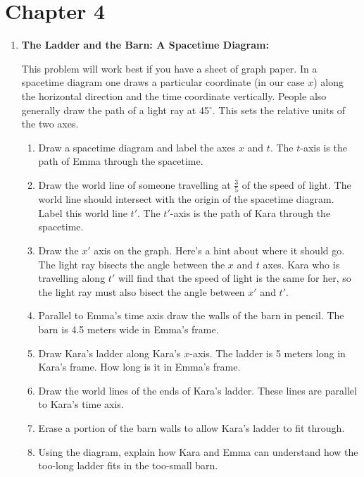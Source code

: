 \documentclass[pdftex,10pt]{article}
\begin{document}
\fi
\section{Chapter 4}
\begin{enumerate}
\item{\bf The Ladder and the Barn: A Spacetime Diagram:}

This problem will work best if you have a sheet of graph paper.
In a spacetime diagram one draws a particular coordinate (in our case
$x$)  along the horizontal direction and the time coordinate
vertically.  People also generally draw the path of a light ray at
45$^\circ$.  This sets the relative units of the two axes.
\begin{enumerate}
\item Draw a spacetime diagram and label the axes $x$ and
  $t$.  The $t$-axis is the path of Emma through the spacetime.

\item Draw the world line of someone travelling at
  $\frac{3}{5}$ of the speed of light.  The world line should
  intersect with the origin of the spacetime diagram.  Label this
  world line $t'$.  The $t'$-axis is the path of Kara through the
  spacetime. 

\item Draw the $x'$ axis on the graph.   Here's a hint about
  where it should go.   The light ray bisects the angle between the
  $x$ and $t$ axes.  Kara who is travelling along $t'$ will find that
  the speed of light is the same for her, so the light ray must also
  bisect the angle between $x'$ and $t'$.

\item Parallel to Emma's time axis draw the walls of the barn
  in pencil.  The barn is 4.5 meters wide in Emma's frame.

\item Draw Kara's ladder along Kara's $x$-axis.   The ladder
is 5 meters long in Kara's frame.  How long is it in Emma's frame.

\item Draw the world lines of the ends of Kara's ladder.
These lines are parallel to Kara's time axis.

\item Erase a portion of the barn walls to allow Kara's ladder
  to fit through.   

\item Using the diagram, explain how Kara and Emma can
  understand how the too-long ladder fits in the too-small barn.
\end{enumerate}
\medskip


\end{enumerate}
\end{document}
